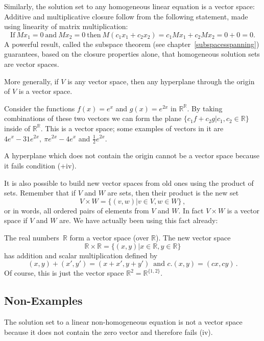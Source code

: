 Similarly, the solution set to any homogeneous linear equation is a vector space:
Additive and multiplicative closure follow from the following statement, made using linearity of matrix multiplication:
\[\text{If}~Mx_1=0 ~\mbox{and}~Mx_2=0~ \mbox{then} ~M(c_1x_1 + c_2x_2)=c_1Mx_1+c_2Mx_2=0+0=0.\] 
A powerful result, called the subspace theorem (see chapter~\ref{subspacesspanning}) guarantees, based on the closure properties alone, that homogeneous
solution sets are vector spaces.

More generally, if $V$ is any vector space, then any hyperplane through the origin of $V$ is a vector space. 

\begin{example} Consider the functions $f(x)=e^x$ and $g(x)=e^{2x}$ in $\mathbb{R}^{\mathbb{R}}$. By taking combinations of these two vectors we can form the plane $\{ c_1 f+ c_2 g | c_1,c_2 \in \mathbb{R}\}$
inside of $\mathbb{R}^{\mathbb{R}}$. This is a vector space; 
some examples of vectors in it are 
$4e^x-31e^{2x},~\pi e^{2x}-4e^x$ and $\frac12e^{2x}$. 
\end{example}

A hyperplane which does not contain the origin cannot be a vector space because it fails condition (+iv).

It is also possible to build new vector spaces from old ones using the product of sets. Remember that if $V$ and $W$ are sets, then
their product is the new set
\[
V\times W = \{(v,w)|v\in V, w\in W\}\, ,
\]
or in words, all ordered pairs of elements from $V$ and $W$.
In fact $V\times W$ is a vector space if $V$ and $W$ are. We have actually been using this fact already:

\begin{example}
The real numbers~${\mathbb R}$ form a vector space (over ${\mathbb R}$). The new vector space
\[{\mathbb R}\times {\mathbb R}=\{(x,y)|x\in{\mathbb R}, y\in {\mathbb R}\}\]
has addition and scalar multiplication defined by
\[
(x,y)+(x',y')=(x+x',y+y')\, \mbox{ and } c.(x,y)=(cx,cy)\, .
\]
Of course, this is just the vector space ${\mathbb R}^2={\mathbb R}^{\{1,2\}}$. 
\end{example}

\subsection{Non-Examples} 
The solution set to a linear non-homogeneous equation is not a vector space because it does not contain the zero vector and therefore fails (iv).


